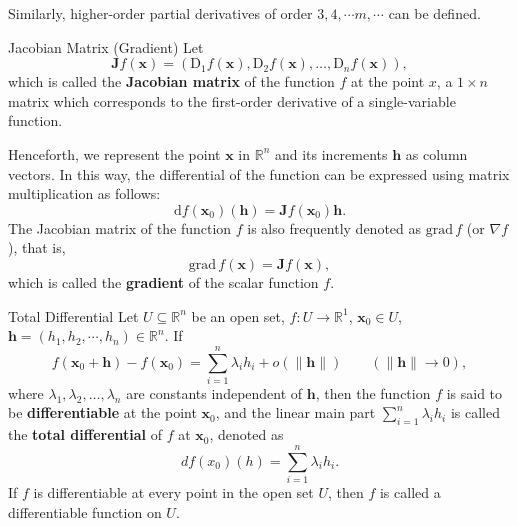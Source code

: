 \documentclass[11pt]{elegantbook}
\begin{document}
Similarly, higher-order partial derivatives of order \(3,4,\cdots m,\cdots\) can be defined.

\begin{definition}{Jacobian Matrix (Gradient)}
    Let
    \[
    \boldsymbol{J}f(\boldsymbol{x}) = (\mathrm{D}_1 f(\boldsymbol{x}), \mathrm{D}_2 f(\boldsymbol{x}), \dots, \mathrm{D}_n f(\boldsymbol{x})),
    \]
    which is called the \textbf{Jacobian matrix} of the function \( f \) at the point \( x \), 
    a \( 1 \times n \) matrix which corresponds to the first-order derivative of a single-variable function.

    Henceforth, we represent the point \(\boldsymbol{x}\) in \( \mathbb{R}^n \) and its increments \(\boldsymbol{h}\) as column vectors.
    In this way, the differential of the function can be expressed using matrix multiplication as follows:
    \[
    \mathrm{d}f(\boldsymbol{x}_0)(\boldsymbol{h}) = \boldsymbol{J}f(\boldsymbol{x}_0) \boldsymbol{h}.
    \]
    The Jacobian matrix of the function \( f \) is also frequently denoted as \(\boldsymbol{\mathrm{grad}}\,f\) (or \(\nabla f\)), that is,
    \[
    \boldsymbol{\mathrm{grad}}\,f(\boldsymbol{x}) = \boldsymbol{J}f(\boldsymbol{x}),
    \]
    which is called the \textbf{gradient} of the scalar function \( f \).
\end{definition}


\begin{definition}{Total Differential}
    Let \(U\subseteq \mathbb{R}^n\) be an open set, \(f: U\to \mathbb{R}^{1}\), \(\boldsymbol{x}_{0}\in U\),
    \(\boldsymbol{h}=\left( h_{1},h_{2},\cdots,h_{n} \right) \in \mathbb{R}^{n}\). If
    \[
    f(\boldsymbol{x}_0 + \boldsymbol{h}) - f(\boldsymbol{x}_0) = \sum_{i=1}^n \lambda_i h_i + o(\|\boldsymbol{h}\|) \qquad (\|\boldsymbol{h}\| \to 0),
    \]
    where \(\lambda_1, \lambda_2, \dots, \lambda_n\) are constants independent of \(\boldsymbol{h}\), 
    then the function \(f\) is said to be \textbf{differentiable} at the point \(\boldsymbol{x}_0\), 
    and the linear main part \(\sum_{i=1}^n \lambda_i h_i\) is called the \textbf{total differential} of \(f\) at \(\boldsymbol{x}_0\), 
    denoted as
    \[
    df(x_0)(h) = \sum_{i=1}^n \lambda_i h_i.
    \]
    If \(f\) is differentiable at every point in the open set \(U\), 
    then \(f\) is called a differentiable function on \(U\).    
\end{definition}
\end{document}
